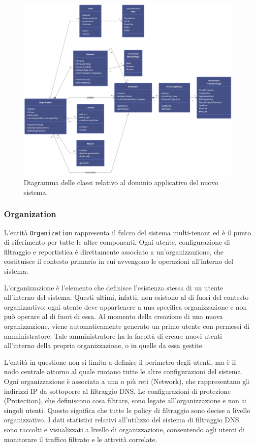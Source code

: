 \begin{figure}
  \centering
  \includegraphics[width=1\textwidth]{./figures/nuovo-cloud-model.png}
  \caption{Diagramma delle classi relativo al dominio applicativo del nuovo sistema.}
  \label{fig:domain_model}
\end{figure}

\subsubsection{Organization}
L'entità \texttt{Organization} rappresenta il fulcro del sistema multi-tenant ed è il punto di riferimento per tutte le altre componenti. Ogni utente, configurazione di filtraggio e reportistica è direttamente associato a un'organizzazione, che costituisce il contesto primario in cui avvengono le operazioni all'interno del sistema.

L'organizzazione è l'elemento che definisce l'esistenza stessa di un utente all'interno del sistema. Questi ultimi, infatti, non esistono al di fuori del contesto organizzativo: ogni utente deve appartenere a una specifica organizzazione e non può operare al di fuori di essa. Al momento della creazione di una nuova organizzazione, viene automaticamente generato un primo utente con permessi di amministratore. Tale amministratore ha la facoltà di creare nuovi utenti all'interno della propria organizzazione, o in quelle da essa gestite.

L'entità in questione non si limita a definire il perimetro degli utenti, ma è il nodo centrale attorno al quale ruotano tutte le altre configurazioni del sistema. Ogni organizzazione è associata a una o più reti (Network), che rappresentano gli indirizzi IP da sottoporre al filtraggio DNS. Le configurazioni di protezione (Protection), che definiscono cosa filtrare, sono legate all'organizzazione e non ai singoli utenti. Questo significa che tutte le policy di filtraggio sono decise a livello organizzativo. I dati statistici relativi all’utilizzo del sistema di filtraggio DNS sono raccolti e visualizzati a livello di organizzazione, consentendo agli utenti di monitorare il traffico filtrato e le attività correlate.


